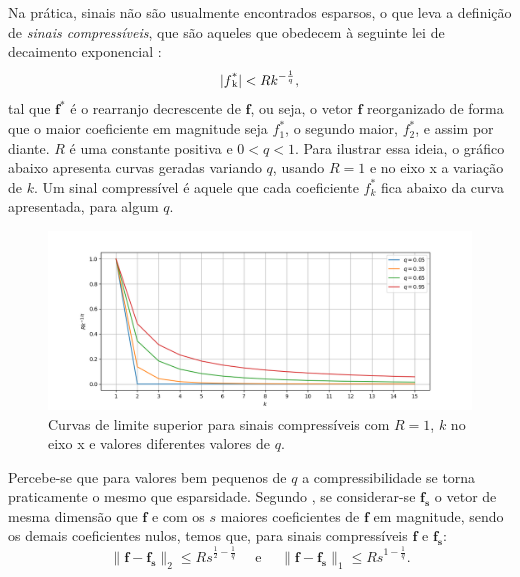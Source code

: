 \documentclass[cic,tc]{iiufrgs}
\def\SPSB#1#2{\rlap{\textsuperscript{#1}}\SB{#2}}
\def\SB#1{\textsubscript{#1}}
\renewcommand{\vec}[1]{\bm{#1}}
\begin{document}
Na prática, sinais não são usualmente encontrados esparsos, o que leva a definição de \textit{sinais compressíveis},
que são aqueles que obedecem à seguinte lei de decaimento exponencial \cite{chen2015compressed}:
\begin{equation}
    \label{eq:compressiblesignal}
    | f\SPSB{*}{k} | < R k^{-\frac{1}{q}},  
\end{equation}
tal que $\vec{f}^* $ é o rearranjo decrescente de $\vec{f}$, ou seja, o vetor $\vec{f}$ reorganizado de forma que o maior 
coeficiente em magnitude seja $f_1^*$, o segundo maior, $f_2^*$, e assim por diante. $R$ é uma constante positiva e $0< q < 1$. 
Para ilustrar essa ideia, o gráfico abaixo apresenta curvas geradas variando $q$, usando $R=1$
e no eixo x a variação de $k$.
Um sinal compressível é aquele que cada coeficiente $f_k^*$ fica abaixo da curva apresentada,
para algum $q$. 
\begin{figure}[H]
    \caption{Curvas de limite superior para sinais compressíveis com $R=1$, $k$ no eixo x e valores 
    diferentes valores de $q$.}
    \begin{center}
        \includegraphics[width=\textwidth]{img/rkq.png}
    \end{center}
    \label{fig:sinaiscompressiveis}
\end{figure}

Percebe-se que para valores bem pequenos de $q$ a compressibilidade se torna praticamente o mesmo que esparsidade.
Segundo \citet{chen2015compressed}, se considerar-se 
$\vec{f_s}$ o vetor de mesma dimensão que $\vec{f}$ e com os $s$ maiores coeficientes de $\vec{f}$ em magnitude, 
sendo os demais coeficientes nulos,
temos que, para sinais compressíveis $\vec{f}$ e 
$\vec{f_s}$:
\begin{equation}
    \lVert \vec{f} - \vec{f_s} \rVert_2 \le Rs^{\frac{1}{2} - \frac{1}{q}} \hspace{1em} \text{ e } \hspace{1em}
    \lVert \vec{f} - \vec{f_s} \rVert_1 \le Rs^{1 - \frac{1}{q}}.
\end{equation} 
\end{document}
